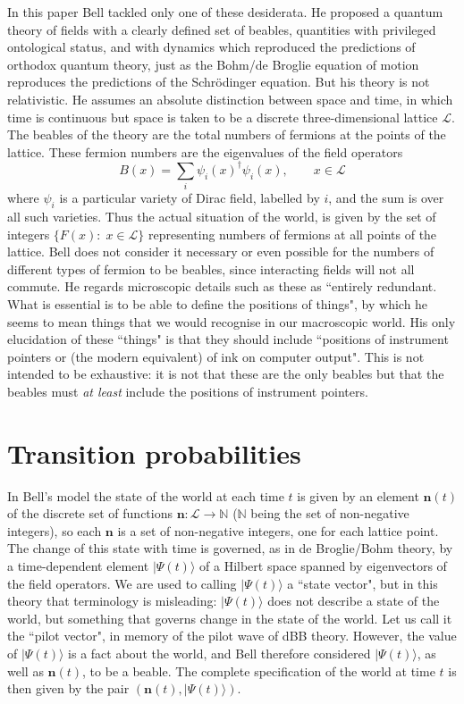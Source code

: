\documentclass[12pt,reqno]{article}
\renewcommand{\(}{\left(}
\renewcommand{\)}{\right)}
\renewcommand{\.}{\centerdot}
\newcommand{\n}{\mathbf{n}}
\newcommand{\N}{\mathbb{N}}
\renewcommand{\L}{\mathcal{L}}
\newcommand{\1}{\mathbf{1}}
\newcommand{\<}{\langle}
\renewcommand{\>}{\rangle}
\theoremstyle{definition}
\theoremstyle{remark}
\numberwithin{equation}{section}
\begin{document}
In this paper Bell tackled only one of these desiderata. He proposed a quantum theory of fields with a clearly defined set of beables, quantities with privileged ontological status, and with dynamics which reproduced the predictions of orthodox quantum theory, just as the Bohm/de Broglie equation of motion reproduces the predictions of the Schr\"odinger equation. But his theory is not relativistic. He assumes an absolute distinction between space and time, in which time is continuous but space is taken to be a discrete three-dimensional lattice $\mathcal{L}$. The beables of the theory are the total numbers of fermions at the points of the lattice. These fermion numbers are the eigenvalues of the field operators 
\[
B(x) = \sum_i \psi_i(x)^\dagger\psi_i(x), \qquad x\in\L
\]
where $\psi_i$ is a particular variety of Dirac field, labelled by $i$, and the sum is over all such varieties. Thus the actual situation of the world, is given by the set of integers $\{F(x):\; x\in\L\}$ representing numbers of fermions at all points of the lattice. Bell does not consider it necessary or even possible for the numbers of different types of fermion to be beables, since interacting fields will not all commute. He regards microscopic details such as these as ``entirely redundant. What is essential is to be able to define the positions of things", by which he seems to mean things that we would recognise in our macroscopic world. His only elucidation of these ``things" is that they should include ``positions of instrument pointers or (the modern equivalent) of ink on computer output". This is not intended to be exhaustive: it is not that these are the only beables but that the beables must \emph{at least} include the positions of instrument pointers.
 

\section{Transition probabilities}

In Bell's model the state of the world at each time $t$ is given by an element $\n(t)$ of the discrete set of functions $\n:\L\to\N$ ($\N$ being the set of non-negative integers), so each $\n$ is a set of non-negative integers, one for each lattice point. The change of this state with time is governed, as in de Broglie/Bohm theory, by a time-dependent element $|\Psi(t)\>$ of a Hilbert space spanned by eigenvectors of the field operators. We are used to calling $|\Psi(t)\>$ a ``state vector", but in this theory that terminology is misleading: $|\Psi(t)\>$ does not describe a state of the world, but something that governs change in the state of the world. Let us call it the ``pilot vector", in memory of the pilot wave of dBB theory. However, the value of $|\Psi(t)\>$ is a fact about the world, and Bell therefore considered $|\Psi(t)\>$, as well as $\n(t)$, to be a beable. The complete specification of the world at time $t$ is then given by the pair $(\n(t),|\Psi(t)\>)$.
 
\end{document}

